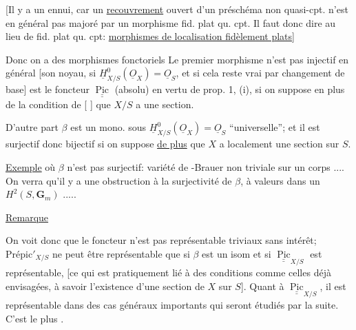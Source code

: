 [Il y a un ennui, car un \uline{recouvrement} ouvert d'un préschéma non quasi-cpt. n'est en général pas majoré par un morphisme fid. plat qu. cpt. Il faut donc dire au lieu de fid. plat qu. cpt:   \uline{morphismes de localisation fidèlement plats}]

Donc on a des morphismes fonctoriels
Le premier morphisme n'est pas injectif en général [son noyau, si $\underline H^0_{X/S}(\underline O_X)=\underline O_S$, et si cela reste vrai par changement de base] est le foncteur $\underline{\underline{\operatorname{Pic}}}$ (absolu) en vertu de prop. 1, (i),  si on suppose en plus de la condition de [ ] que $X/S$ a une section. 

D'autre part $\beta$ est un mono. sous  $\underline H^0_{X/S}(\underline O_X)=\underline O_S$ ``universelle''; et il est surjectif donc bijectif si on suppose \uline{de plus} que  $X$ a localement une section sur $S$.

\uline{Exemple} où $\beta$ n'est pas surjectif: variété de -Brauer non triviale sur un corps .... On verra qu'il y a une obstruction à la surjectivité de $\beta$, à valeurs dans un $H^2(S,\mathbf G_m)$ .....

\uline{Remarque}

On voit donc que le foncteur  n'est pas représentable    triviaux sans intérêt; $\mathrm{Prépic}'_{X/S}$ ne peut être représentable que si $\beta$ est un isom et si $\underline{\underline{\operatorname{Pic}}}_{X/S}$ est représentable,  [ce qui est pratiquement lié à des conditions comme celles déjà envisagées, à savoir l'existence d'une section de $X$ sur $S$]. Quant à $\underline{\underline{\operatorname{Pic}}}_{X/S}$, il est représentable dans des cas généraux importants qui seront étudiés par la suite. C'est  le plus .
